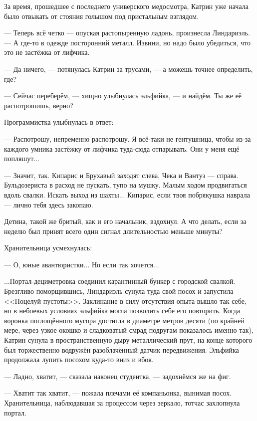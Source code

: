 За время, прошедшее с последнего универского медосмотра,
Катрин уже начала было отвыкать от стояния голышом под пристальным взглядом.

--- Теперь всё четко --- опуская растопыренную ладонь, произнесла Линдариэль.
--- А где-то в одежде посторонний металл. Извини, но надо было убедиться, что это не застёжка от лифчика.

--- Да ничего, --- потянулась Катрин за трусами, --- а можешь точнее определить, где?

--- Сейчас переберём, --- хищно улыбнулась эльфийка, --- и найдём. Ты же её распотрошишь, верно?

Программистка улыбнулась в ответ:

--- Распотрошу, непременно распотрошу. Я всё-таки не гентушница,
чтобы из-за каждого умника застёжку от лифчика туда-сюда отпарывать. Они у меня ещё попляшут...

\emptypar

--- Значит, так. Кипарис и Брухавый заходят слева, Чека и Вантуз --- справа.
Бульдозериста в расход не пускать, тупо на мушку. Малым ходом продвигаться вдоль свалки. Искать выход из шахты...
Кипарис, если твоя побрякушка наврала --- лично тебя здесь закопаю.

Детина, такой же бритый, как и его начальник, вздохнул. А что делать,
если за неделю был принят всего один сигнал длительностью меньше минуты?

\emptypar

Хранительница усмехнулась:

--- О, юные авантюристки... Но если так хочется...

...Портал-дециметровка соединил карантинный бункер с городской свалкой.
 Брезгливо поморщившись, Линдариэль сунула туда свой посох и запустила <<Поцелуй пустоты>>.
 Заклинание в силу отсутствия опыта вышло так себе, но в небоевых условиях эльфийка могла позволить себе его повторить.
 Когда воронка поглощённого мусора достигла в диаметре метров десяти
 (по крайней мере, через узкое окошко и сладковатый смрад подругам показалось именно так),
 Катрин сунула в пространственную дыру металлический прут,
 на конце которого был торжественно водружён разоблачённый датчик передвижения.
 Эльфийка продолжала лупить посохом куда-то вниз и вбок.

--- Ладно, хватит, --- сказала наконец студентка, --- задохнёмся же на фиг.

--- Хватит так хватит, --- пожала плечами её компаньонка, вынимая посох.
Хранительница, наблюдавшая за процессом через зеркало, тотчас захлопнула портал.

